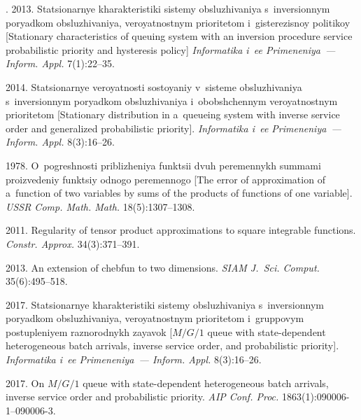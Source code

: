 \begin{multicols}{2}
{{\begin{thebibliography}{99}
. 2013.
Statsionarnye kharakteristiki sistemy obsluzhivaniya
s~inversionnym poryadkom obsluzhivaniya,
veroyatnostnym prio\-ri\-te\-tom i~gisterezisnoy politikoy
[Stationary characteristics of queuing system with
an inversion procedure service probabilistic priority
and hysteresis policy]
\textit{Informatika i~ee Primeneniya~--- Inform. Appl.} 7(1):22--35.

 2014.
Statsio\-nar\-nye veroyatnosti sostoyaniy v~sisteme obsluzhivaniya 
s~inversionnym poryadkom obsluzhivaniya i~obobshchennym veroyat\-no\-st\-nym
prioritetom
[Stationary distribution in a~queueing system with inverse service 
order and generalized probabilistic priority].
\textit{Informatika i~ee Primeneniya~--- Inform. Appl.} 8(3):16--26.

 1978.
O~pogreshnosti priblizheniya funktsii dvuh peremennykh summami
proizvedeniy funktsiy odnogo peremennogo
[The error of approximation of a~function of two variables by sums 
of the products of functions of one variable].
\textit{ %
USSR Comp. Math. Math.} %
18(5):1307--1308.

 2011. Regularity of tensor product approximations to square
integrable functions. \textit{Constr. Approx.} 34(3):371--391.

2013. An extension of chebfun to two dimensions.
\textit{SIAM J.~Sci. Comput.} 35(6):495--518.

 2017.
Statsionarnye kharakteristiki sistemy obsluzhivaniya 
s~inversionnym poryadkom obsluzhivaniya, veroyatnostnym prioritetom 
i~gruppovym postupleniyem raznorodnykh zayavok
[${M/G/1}$ queue with state-dependent heterogeneous batch arrivals, 
inverse service order, and probabilistic priority].
\textit{Informatika i~ee Primeneniya~--- Inform. Appl.} 8(3):16--26.


 2017. 
On ${M/G/1}$ queue with state-dependent heterogeneous batch arrivals,
 inverse service order and probabilistic priority. 
 \textit{AIP Conf. Proc.} 1863(1):090006-1--090006-3.

\end{thebibliography}

 }
 }

\end{multicols}

